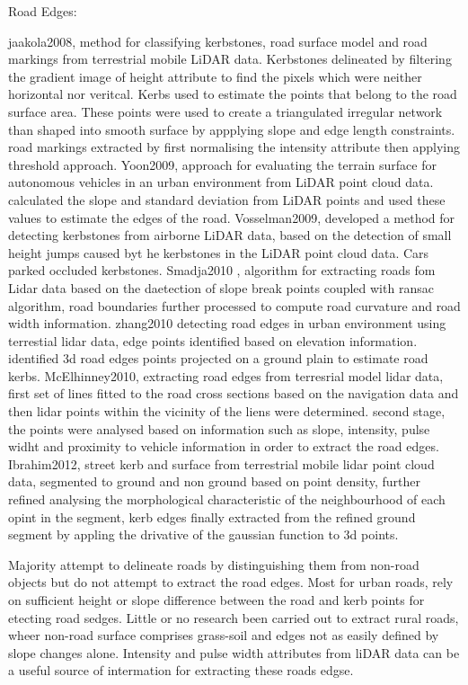 \begin{multicols}{2}
Road Edges:

jaakola2008, method for classifying kerbstones, road surface model and road markings from terrestrial mobile LiDAR data. Kerbstones delineated by filtering the gradient image of height attribute to find the pixels which were neither horizontal nor veritcal. Kerbs used to estimate the points that belong to the road surface area. These points were used to create a triangulated irregular network than shaped into smooth surface by appplying slope and edge length constraints. road markings extracted by first normalising the intensity attribute then applying threshold approach.
Yoon2009, approach for evaluating the terrain surface for autonomous vehicles in an urban environment from LiDAR point cloud data. calculated the slope and standard deviation from LiDAR points and used these values to estimate the edges of the road.
Vosselman2009, developed a method for detecting kerbstones from airborne LiDAR data, based on the detection of small height jumps caused byt he kerbstones in the LiDAR point cloud data. Cars parked occluded kerbstones.
Smadja2010 \citep{smadja2010}, algorithm for extracting roads fom Lidar data based on the daetection of slope break points coupled with ransac algorithm, road boundaries further processed to compute road curvature and road width information.
zhang2010 detecting road edges in urban environment using terrestial lidar data, edge points identified based on elevation information. identified 3d road edges points projected on a ground plain to estimate road kerbs.
McElhinney2010, extracting road edges from terresrial model lidar data, first set of lines fitted to the road cross sections based on the navigation data and then lidar points within the vicinity of the liens were determined. second stage, the points were analysed based on information such as slope, intensity, pulse widht and proximity to vehicle information in order to extract the road edges.
Ibrahim2012, street kerb and surface from terrestrial mobile lidar point cloud data, segmented to ground and non ground based on point density, further refined analysing the morphological characteristic of the neighbourhood of each opint in the segment, kerb edges finally extracted from the refined ground segment by appling the drivative of the gaussian function to 3d points.

Majority attempt to delineate roads by distinguishing them from non-road objects but do not attempt to extract the road edges. Most for urban roads, rely on sufficient height or slope difference between the road and kerb points for etecting road sedges. Little or no research been carried out to extract rural roads, wheer non-road surface comprises grass-soil and edges not as easily defined by slope changes alone. Intensity and pulse width attributes from liDAR data can be a useful source of intermation for extracting these roads edgse. 



\end{multicols}
